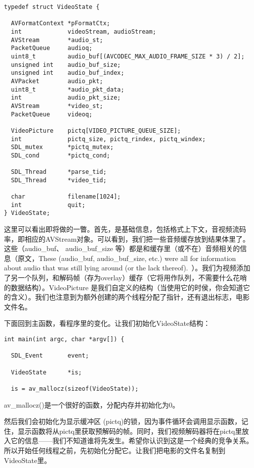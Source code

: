 \begin{lstlisting}
typedef struct VideoState {

  AVFormatContext *pFormatCtx;
  int             videoStream, audioStream;
  AVStream        *audio_st;
  PacketQueue     audioq;
  uint8_t         audio_buf[(AVCODEC_MAX_AUDIO_FRAME_SIZE * 3) / 2];
  unsigned int    audio_buf_size;
  unsigned int    audio_buf_index;
  AVPacket        audio_pkt;
  uint8_t         *audio_pkt_data;
  int             audio_pkt_size;
  AVStream        *video_st;
  PacketQueue     videoq;

  VideoPicture    pictq[VIDEO_PICTURE_QUEUE_SIZE];
  int             pictq_size, pictq_rindex, pictq_windex;
  SDL_mutex       *pictq_mutex;
  SDL_cond        *pictq_cond;

  SDL_Thread      *parse_tid;
  SDL_Thread      *video_tid;

  char            filename[1024];
  int             quit;
} VideoState;
\end{lstlisting}

这里可以看出即将做的一瞥。首先，是基础信息，包括格式上下文，音视频流码率，即相应的AVStream对象。可以看到，我们把一些音频缓存放到结果体里了。这些（audio_buf、 audio_buf_size 等）都是和缓存里（或不在）音频相关的信息（原文，These (audio_buf, audio_buf_size, etc.) were all for information about audio that was still lying around (or the lack thereof). ）。我们为视频添加了另一个队列，和解码帧（存为overlay）缓存（它将用作队列，不需要什么花哨的数据结构）。VideoPicture 是我们自定义的结构（当使用它的时侯，你会知道它的含义）。我们也注意到为额外创建的两个线程分配了指针，还有退出标志，电影文件名。

下面回到主函数，看程序里的变化。让我们初始化VideoState结构：

\begin{lstlisting}
int main(int argc, char *argv[]) {

  SDL_Event       event;

  VideoState      *is;

  is = av_mallocz(sizeof(VideoState));
  \end{lstlisting}

av_mallocz()是一个很好的函数，分配内存并初始化为0。

然后我们会初始化为显示缓冲区 (pictq)的锁，因为事件循环会调用显示函数，记住，显示函数将从pictq里获取预解码的帧。同时，我们视频解码器将在pictq里放入它的信息——我们不知道谁将先发生。希望你认识到这是一个经典的竞争关系。所以开始任何线程之前，先初始化分配它。让我们把电影的文件名复制到VideoState里。

